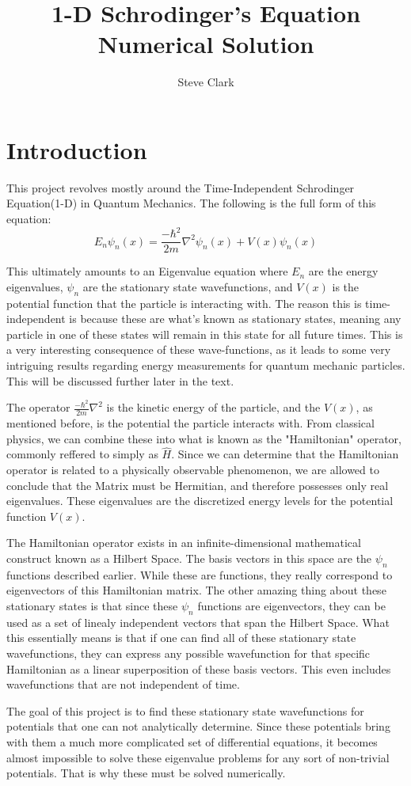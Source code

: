 \documentclass[11pt]{article} %
\title{1-D Schrodinger's Equation Numerical Solution}
\author{Steve Clark}
\begin{document}
\maketitle

\section{Introduction}
\par This project revolves mostly around the Time-Independent Schrodinger Equation(1-D) in Quantum Mechanics. The following is the full form of this equation:
\begin{equation}
E_n \psi _n (x) = \frac{-\hbar ^2}{2m}\nabla ^2 \psi _n (x) + V(x) \psi_n(x)
\end{equation}
\par This ultimately amounts to an Eigenvalue equation where $E_n$ are the energy eigenvalues, $\psi _n$ are the stationary state wavefunctions, and $V(x)$ is the potential function that the particle is interacting with. The reason this is time-independent is because these are what's known as stationary states, meaning any particle in one of these states will remain in this state for all future times. This is a very interesting consequence of these wave-functions, as it leads to some very intriguing results regarding energy measurements for quantum mechanic particles. This will be discussed further later in the text. 
\par The operator $\frac{-\hbar ^2}{2m}\nabla ^2$ is the kinetic energy of the particle, and the $V(x)$, as mentioned before, is the potential the particle interacts with. From classical physics, we can combine these into what is known as the "Hamiltonian" operator, commonly reffered to simply as $\hat{H}$. Since we can determine that the Hamiltonian operator is related to a physically observable phenomenon, we are allowed to conclude that the Matrix must be Hermitian, and therefore possesses only real eigenvalues. These eigenvalues are the discretized energy levels for the potential function $V(x)$. 
\par The Hamiltonian operator exists in an infinite-dimensional mathematical construct known as a Hilbert Space. The basis vectors in this space are the $\psi _n$ functions described earlier. While these are functions, they really correspond to eigenvectors of this Hamiltonian matrix. The other amazing thing about these stationary states is that since these $\psi _n$ functions are eigenvectors, they can be used as a set of linealy independent vectors that span the Hilbert Space. What this essentially means is that if one can find all of these stationary state wavefunctions, they can express any possible wavefunction for that specific Hamiltonian as a linear superposition of these basis vectors. This even includes wavefunctions that are not independent of time. 
\par The goal of this project is to find these stationary state wavefunctions for potentials that one can not analytically determine. Since these potentials bring with them a much more complicated set of differential equations, it becomes almost impossible to solve these eigenvalue problems for any sort of non-trivial potentials. That is why these must be solved numerically. 
\end{document}
